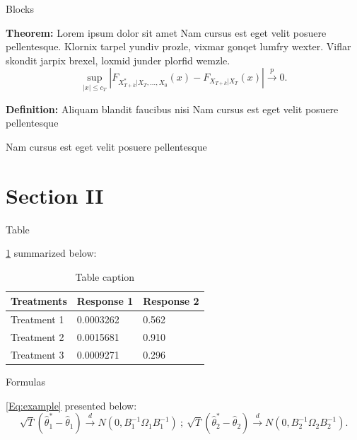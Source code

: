 \documentclass[aspectratio=169,xcolor=x11names]{beamer}
\begin{document}
\begin{frame}{Blocks}
\bigskip 

    \begin{block}{\textbf{Theorem:} Lorem ipsum dolor sit amet}
        Nam cursus est eget velit posuere pellentesque. Klornix tarpel yundiv prozle, vixmar gonqet lumfry wexter. Viflar skondit jarpix brexel, loxmid junder plorfid wemzle. 
$$
   \sup_{|x|\leq c_T}\left|F_{X^*_{T+k}|X_{T},\ldots, X_{0}}(x) - F_{X_{T+k}|X_{T}}(x)\right|\overset{p}{\to} 0.   
$$
    \end{block}

    \begin{alertblock}{\textbf{Definition:} Aliquam blandit faucibus nisi}
        Nam cursus est eget velit posuere pellentesque
    \end{alertblock}

    \begin{example}
        Nam cursus est eget velit posuere pellentesque
    \end{example}
\end{frame}



\section{Section II}


\begin{frame}{Table}

\cref{Table:example} summarized below:
    \begin{table}
        \begin{tabular}{lll}
            \toprule
            \textbf{Treatments} & \textbf{Response 1} & \textbf{Response 2} \\
            \midrule
            Treatment 1         & 0.0003262           & 0.562               \\
            Treatment 2         & 0.0015681           & 0.910               \\
            Treatment 3         & 0.0009271           & 0.296               \\
            \bottomrule
        \end{tabular}
        \caption{Table caption \label{Table:example}}  
    \end{table}
\end{frame}


\begin{frame}{Formulas}

\cref{Eq:example} presented below:
\begin{equation}\label{Eq:example}
         \sqrt{T}(\widehat{\theta}^*_1 - \widehat{\theta}_1) \overset{d}{\to} N(0,B_1^{-1}\Omega_1 B_1^{-1})~;~\sqrt{T}(\widehat{\theta}^*_2 - \widehat{\theta}_2) \overset{d}{\to} N(0,B_2^{-1}\Omega_2 B_2^{-1}).
\end{equation}


\end{frame}
\end{document}
